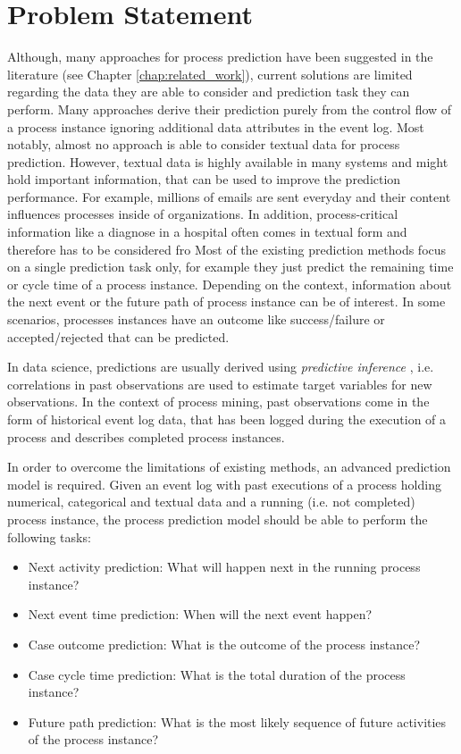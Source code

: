 \section{Problem Statement}

Although, many approaches for process prediction have been suggested in the literature (see Chapter \ref{chap:related_work}), current solutions are limited regarding the data they are able to consider and prediction task they can perform.
Many approaches derive their prediction purely from the control flow of a process instance ignoring additional data attributes in the event log.
Most notably, almost no approach is able to consider textual data for process prediction.
However, textual data is highly available in many systems and might hold important information, that can be used to improve the prediction performance.
For example, millions of emails are sent everyday and their content influences processes inside of organizations.
In addition, process-critical information like a diagnose in a hospital often comes in textual form and therefore has to be considered fro
Most of the existing prediction methods focus on a single prediction task only, for example they just predict the remaining time or cycle time of a process instance.
Depending on the context, information about the next event or the future path of process instance can be of interest.
In some scenarios, processes instances have an outcome like success/failure or accepted/rejected that can be predicted.

In data science, predictions are usually derived using \textit{predictive inference} \cite{predinf}, i.e. correlations in past observations are used to estimate target variables for new observations.
In the context of process mining, past observations come in the form of historical event log data, that has been logged during the execution of a process and describes completed process instances.

In order to overcome the limitations of existing methods, an advanced prediction model is required.
Given an event log with past executions of a process holding numerical, categorical and textual data and a running (i.e. not completed) process instance, the process prediction model should be able to perform the following tasks:

\begin{itemize}
	\item Next activity prediction: What will happen next in the running process instance?
	\item Next event time prediction: When will the next event happen?
	\item Case outcome prediction: What is the outcome of the process instance?
	\item Case cycle time prediction: What is the total duration of the process instance?
	\item Future path prediction: What is the most likely sequence of future activities of the process instance?
\end{itemize}

